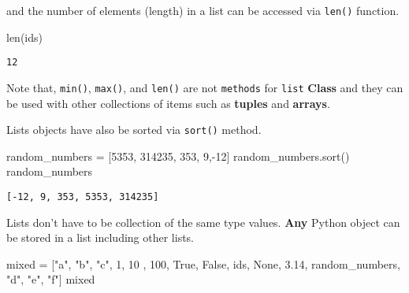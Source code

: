\documentclass[
  letterpaper,
  DIV=11,
  numbers=noendperiod]{scrreprt}
\newenvironment{Shaded}{\begin{snugshade}}{\end{snugshade}}
\newcommand{\BuiltInTok}[1]{\textcolor[rgb]{0.00,0.23,0.31}{#1}}
\newcommand{\DecValTok}[1]{\textcolor[rgb]{0.68,0.00,0.00}{#1}}
\newcommand{\FloatTok}[1]{\textcolor[rgb]{0.68,0.00,0.00}{#1}}
\newcommand{\NormalTok}[1]{\textcolor[rgb]{0.00,0.23,0.31}{#1}}
\newcommand{\OperatorTok}[1]{\textcolor[rgb]{0.37,0.37,0.37}{#1}}
\newcommand{\StringTok}[1]{\textcolor[rgb]{0.13,0.47,0.30}{#1}}
\newcommand{\VariableTok}[1]{\textcolor[rgb]{0.07,0.07,0.07}{#1}}
\begin{document}
and the number of elements (length) in a list can be accessed via
\texttt{len()} function.

\begin{Shaded}
\begin{Highlighting}[]
\BuiltInTok{len}\NormalTok{(ids)}
\end{Highlighting}
\end{Shaded}

\begin{verbatim}
12
\end{verbatim}

Note that, \texttt{min()}, \texttt{max()}, and \texttt{len()} are not
\texttt{methods} for \texttt{list} \textbf{Class} and they can be used
with other collections of items such as \textbf{tuples} and
\textbf{arrays}.

Lists objects have also be sorted via \texttt{sort()} method.

\begin{Shaded}
\begin{Highlighting}[]
\NormalTok{random\_numbers }\OperatorTok{=}\NormalTok{ [}\DecValTok{5353}\NormalTok{, }\DecValTok{314235}\NormalTok{, }\DecValTok{353}\NormalTok{, }\DecValTok{9}\NormalTok{,}\OperatorTok{{-}}\DecValTok{12}\NormalTok{]}
\NormalTok{random\_numbers.sort()}
\NormalTok{random\_numbers}
\end{Highlighting}
\end{Shaded}

\begin{verbatim}
[-12, 9, 353, 5353, 314235]
\end{verbatim}

Lists don't have to be collection of the same type values. \textbf{Any}
Python object can be stored in a list including other lists.

\begin{Shaded}
\begin{Highlighting}[]
\NormalTok{mixed }\OperatorTok{=}\NormalTok{ [}\StringTok{"a"}\NormalTok{, }\StringTok{"b"}\NormalTok{, }\StringTok{"c"}\NormalTok{, }\DecValTok{1}\NormalTok{, }\DecValTok{10}\NormalTok{ , }\DecValTok{100}\NormalTok{, }\VariableTok{True}\NormalTok{, }\VariableTok{False}\NormalTok{, ids, }\VariableTok{None}\NormalTok{, }\FloatTok{3.14}\NormalTok{, random\_numbers, }\StringTok{"d"}\NormalTok{, }\StringTok{"e"}\NormalTok{, }\StringTok{"f"}\NormalTok{]}
\NormalTok{mixed}
\end{Highlighting}
\end{Shaded}
\end{document}
